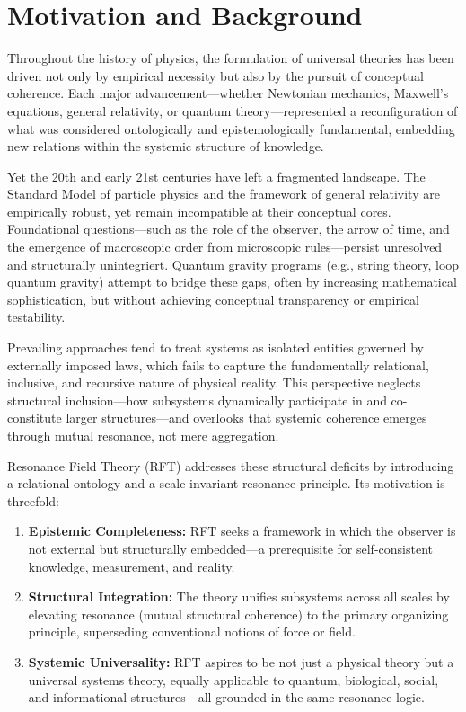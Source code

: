 \documentclass[12pt]{article}
\begin{document}
\section{Motivation and Background}

Throughout the history of physics, the formulation of universal theories has been driven not only by empirical necessity but also by the pursuit of conceptual coherence. Each major advancement—whether Newtonian mechanics, Maxwell's equations, general relativity, or quantum theory—represented a reconfiguration of what was considered ontologically and epistemologically fundamental, embedding new relations within the systemic structure of knowledge.

Yet the 20th and early 21st centuries have left a fragmented landscape. The Standard Model of particle physics and the framework of general relativity are empirically robust, yet remain incompatible at their conceptual cores. Foundational questions—such as the role of the observer, the arrow of time, and the emergence of macroscopic order from microscopic rules—persist unresolved and structurally unintegriert. Quantum gravity programs (e.g., string theory, loop quantum gravity) attempt to bridge these gaps, often by increasing mathematical sophistication, but without achieving conceptual transparency or empirical testability.

Prevailing approaches tend to treat systems as isolated entities governed by externally imposed laws, which fails to capture the fundamentally relational, inclusive, and recursive nature of physical reality. This perspective neglects structural inclusion—how subsystems dynamically participate in and co-constitute larger structures—and overlooks that systemic coherence emerges through mutual resonance, not mere aggregation.

Resonance Field Theory (RFT) addresses these structural deficits by introducing a relational ontology and a scale-invariant resonance principle. Its motivation is threefold:

\begin{enumerate}
	\item \textbf{Epistemic Completeness:} RFT seeks a framework in which the observer is not external but structurally embedded—a prerequisite for self-consistent knowledge, measurement, and reality.
	\item \textbf{Structural Integration:} The theory unifies subsystems across all scales by elevating resonance (mutual structural coherence) to the primary organizing principle, superseding conventional notions of force or field.
	\item \textbf{Systemic Universality:} RFT aspires to be not just a physical theory but a universal systems theory, equally applicable to quantum, biological, social, and informational structures—all grounded in the same resonance logic.
\end{enumerate}
\end{document}
